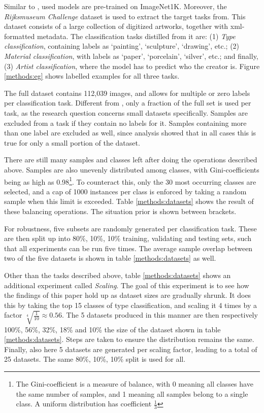 Similar to \citeauthor{sabatelli2018deep}, used models are pre-trained on ImageNet1K. Moreover, the \textit{Rijksmuseum Challenge} dataset \citep{mensink14icmr} is used to extract the target tasks from. This dataset consists of a large collection of digitized artworks, together with xml-formatted metadata. The classification tasks distilled from it are: (1) \textit{Type classification}, containing labels as `painting', `sculpture', `drawing', etc.; (2) \textit{Material classification}, with labels as `paper', `porcelain', `silver', etc.; and finally, (3) \textit{Artist classification}, where the model has to predict who the creator is. Figure \ref{methods:eg} shows labelled examples for all three tasks.

The full dataset contains 112,039 images, and allows for multiple or zero labels per classification task. Different from \citeauthor{sabatelli2018deep}, only a fraction of the full set is used per task, as the research question concerns small datasets specifically. Samples are excluded from a task if they contain no labels for it. Samples containing more than one label are excluded as well, since analysis showed that in all cases this is true for only a small portion of the dataset.

There are still many samples and classes left after doing the operations described above. Samples are also unevenly distributed among classes, with Gini-coefficients being as high as 0.98\footnote{The Gini-coefficient is a measure of balance, with 0 meaning all classes have the same number of samples, and 1 meaning all samples belong to a single class. A uniform distribution has coefficient $\frac{1}{3}$}. To counteract this, only the 30 most occurring classes are selected, and a cap of 1000 instances per class is enforced by taking a random sample when this limit is exceeded. Table \ref{methods:datasets} shows the result of these balancing operations. The situation prior is shown between brackets.

For robustness, five subsets are randomly generated per classification task. These are then split up into 80\%, 10\%, 10\% training, validating and testing sets, such that all experiments can be run five times. The average sample overlap between two of the five datasets is shown in table \ref{methods:datasets} as well.

Other than the tasks described above, table \ref{methods:datasets} shows an additional experiment called \textit{Scaling}. The goal of this experiment is to see how the findings of this paper hold up as dataset sizes are gradually shrunk. It does this by taking the top 15 classes of type classification, and scaling it 4 times by a factor $\sqrt[4]{\frac{1}{10}} \approx 0.56$. The 5 datasets produced in this manner are then respectively 100\%, 56\%, 32\%, 18\% and 10\% the size of the dataset shown in table \ref{methods:datasets}. Steps are taken to ensure the distribution remains the same. Finally, also here 5 datasets are generated per scaling factor, leading to a total of 25 datasets. The same 80\%, 10\%, 10\% split is used for all.

